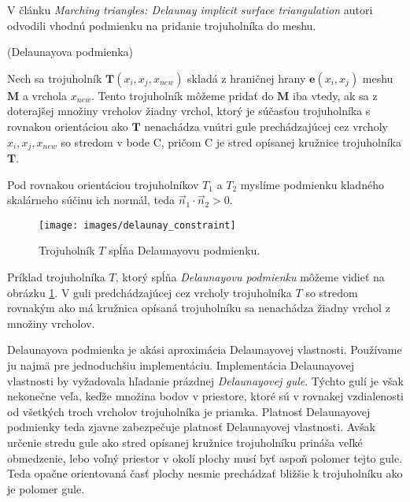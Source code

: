 V článku \textit{Marching triangles: Delaunay implicit surface triangulation} \cite{hilton1997marching}
autori odvodili vhodnú podmienku na pridanie trojuholníka do meshu.

\begin{definition}
    (Delaunayova podmienka)
    \label{def:delaunay_constraint}

    Nech sa trojuholník $\mathbf{T}(x_i, x_j, x_{new})$ skladá z hraničnej hrany $\mathbf{e}(x_i, x_j)$ 
    meshu $\mathbf{M}$ a vrchola $x_{new}$. Tento trojuholník môžeme pridať do 
    $\mathbf{M}$ iba vtedy, ak sa z doterajšej 
    množiny vrcholov žiadny vrchol, ktorý je súčasťou trojuholníka s rovnakou orientáciou ako 
    $\mathbf{T}$ nenachádza vnútri gule prechádzajúcej cez vrcholy $x_i, x_j, x_{new}$ so stredom 
    v bode C, pričom C je stred opísanej kružnice trojuholníka $\mathbf{T}$.
\end{definition}

    Pod rovnakou orientáciou 
    trojuholníkov $T_1$ a $T_2$ myslíme podmienku kladného skalárneho súčinu ich normál, teda 
    $\vec{n}_1 \cdot \vec{n}_2 > 0$.

\begin{figure}
    \centerline{\texttt{[image: images/delaunay\_constraint]}}
    \caption[Trojuholník $T$ spĺňajúci Delaunayovu podmienku]
    {\cite{hilton1996marching} Trojuholník $T$ spĺňa Delaunayovu podmienku.}
    \label{obr:delaunay_constraint}
\end{figure}

Príklad trojuholníka $T$, ktorý spĺňa \textit{Delaunayovu podmienku} môžeme vidieť na obrázku 
\ref{obr:delaunay_constraint}. V guli predchádzajúcej cez vrcholy trojuholníka $T$ so stredom 
rovnakým ako má kružnica opísaná trojuholníku sa nenachádza žiadny vrchol z množiny vrcholov.

Delaunayova podmienka je akási aproximácia Delaunayovej vlastnosti. Používame ju najmä pre jednoduchšiu
implementáciu. Implementácia Delaunayovej vlastnosti by vyžadovala
hľadanie prázdnej \textit{Delaunayovej gule}. Týchto gulí je však nekonečne veľa, keďže množina
bodov v priestore, ktoré sú v rovnakej vzdialenosti od všetkých troch vrcholov trojuholníka je priamka.
Platnosť Delaunayovej podmienky teda zjavne zabezpečuje platnosť Delaunayovej vlastnosti.
Avšak určenie stredu gule ako stred opísanej kružnice trojuholníku prináša veľké obmedzenie,
lebo voľný priestor v okolí plochy musí byť aspoň polomer tejto gule. Teda opačne orientovaná
časť plochy nesmie prechádzať bližšie k trojuholníku ako je polomer gule.

